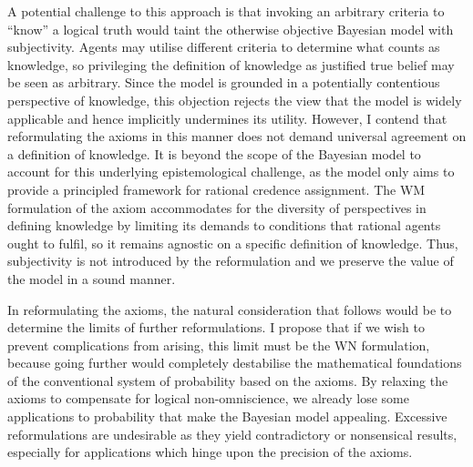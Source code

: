 \documentclass[12pt]{article}
\begin{document}
A potential challenge to this approach is that invoking an arbitrary criteria to ``know'' a logical truth would taint the otherwise objective Bayesian model with subjectivity. Agents may utilise different criteria to determine what counts as knowledge, so privileging the definition of knowledge as justified true belief may be seen as arbitrary. Since the model is grounded in a potentially contentious perspective of knowledge, this objection rejects the view that the model is widely applicable and hence implicitly undermines its utility. However, I contend that reformulating the axioms in this manner does not demand universal agreement on a definition of knowledge. It is beyond the scope of the Bayesian model to account for this underlying epistemological challenge, as the model only aims to provide a principled framework for rational credence assignment. The WM formulation of the axiom accommodates for the diversity of perspectives in defining knowledge by limiting its demands to conditions that rational agents ought to fulfil, so it remains agnostic on a specific definition of knowledge. Thus, subjectivity is not introduced by the reformulation and we preserve the value of the model in a sound manner.

In reformulating the axioms, the natural consideration that follows would be to determine the limits of further reformulations. I propose that if we wish to prevent complications from arising, this limit must be the WN formulation, because going further would completely destabilise the mathematical foundations of the conventional system of probability based on the axioms. By relaxing the axioms to compensate for logical non-omniscience, we already lose some applications to probability that make the Bayesian model appealing.\autocite[436]{oup} Excessive reformulations are undesirable as they yield contradictory or nonsensical results, especially for applications which hinge upon the precision of the axioms.
\end{document}
